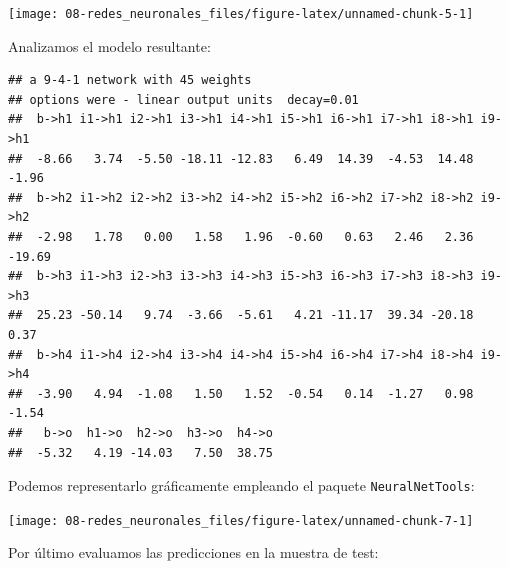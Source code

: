 \documentclass[
]{book}
\newenvironment{Shaded}{\begin{snugshade}}{\end{snugshade}}
\newcommand{\FunctionTok}[1]{\textcolor[rgb]{0.00,0.00,0.00}{#1}}
\newcommand{\NormalTok}[1]{#1}
\newcommand{\SpecialCharTok}[1]{\textcolor[rgb]{0.00,0.00,0.00}{#1}}
\theoremstyle{break}
\theoremstyle{definition}
\theoremstyle{definition}
\theoremstyle{definition}
\theoremstyle{definition}
\theoremstyle{remark}
\begin{document}
\begin{center}\texttt{[image: 08-redes\_neuronales\_files/figure-latex/unnamed-chunk-5-1]} \end{center}

Analizamos el modelo resultante:

\begin{Shaded}
\end{Shaded}

\begin{verbatim}
## a 9-4-1 network with 45 weights
## options were - linear output units  decay=0.01
##  b->h1 i1->h1 i2->h1 i3->h1 i4->h1 i5->h1 i6->h1 i7->h1 i8->h1 i9->h1 
##  -8.66   3.74  -5.50 -18.11 -12.83   6.49  14.39  -4.53  14.48  -1.96 
##  b->h2 i1->h2 i2->h2 i3->h2 i4->h2 i5->h2 i6->h2 i7->h2 i8->h2 i9->h2 
##  -2.98   1.78   0.00   1.58   1.96  -0.60   0.63   2.46   2.36 -19.69 
##  b->h3 i1->h3 i2->h3 i3->h3 i4->h3 i5->h3 i6->h3 i7->h3 i8->h3 i9->h3 
##  25.23 -50.14   9.74  -3.66  -5.61   4.21 -11.17  39.34 -20.18   0.37 
##  b->h4 i1->h4 i2->h4 i3->h4 i4->h4 i5->h4 i6->h4 i7->h4 i8->h4 i9->h4 
##  -3.90   4.94  -1.08   1.50   1.52  -0.54   0.14  -1.27   0.98  -1.54 
##   b->o  h1->o  h2->o  h3->o  h4->o 
##  -5.32   4.19 -14.03   7.50  38.75
\end{verbatim}

Podemos representarlo gráficamente empleando el paquete \texttt{NeuralNetTools}:

\begin{Shaded}
\end{Shaded}

\begin{center}\texttt{[image: 08-redes\_neuronales\_files/figure-latex/unnamed-chunk-7-1]} \end{center}

Por último evaluamos las predicciones en la muestra de test:
\end{document}
